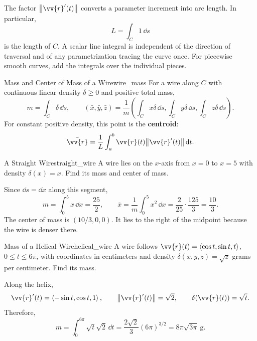 \newpage
The factor $\norm{\vv{r}'(t)}$ converts a parameter increment into arc length. In particular,
\[
    L = \int_C 1\,\dd{s}
\]
is the length of $C$. A scalar line integral is independent of the direction of traversal and of any parametrization tracing the curve once. For piecewise smooth curves, add the integrals over the individual pieces.

\begin{theorem}{Mass and Center of Mass of a Wire}{wire_mass}
For a wire along $C$ with continuous linear density $\delta \ge 0$ and positive total mass,
\[
    m = \int_C \delta\,\dd{s},\qquad
    (\bar{x},\bar{y},\bar{z})
    = \frac{1}{m}\left(\int_C x\delta\,\dd{s},
    \int_C y\delta\,\dd{s},\int_C z\delta\,\dd{s}\right).
\]
For constant positive density, this point is the \textbf{centroid}:
\[
    \bar{\vv{r}} = \frac{1}{L}\int_a^b \vv{r}(t)\norm{\vv{r}'(t)}\,\dd{t}.
\]
\end{theorem}

\begin{problem}{A Straight Wire}{straight_wire}
A wire lies on the $x$-axis from $x = 0$ to $x = 5$ with density $\delta(x) = x$. Find its mass and center of mass.
\end{problem}
\begin{sol}
Since $\dd{s} = \dd{x}$ along this segment,
\[
    m = \int_0^5 x\,\dd{x} = \frac{25}{2},\qquad
    \bar{x} = \frac{1}{m}\int_0^5 x^2\,\dd{x}
    = \frac{2}{25}\cdot\frac{125}{3} = \frac{10}{3}.
\]
The center of mass is $\boxed{(10/3,0,0)}$. It lies to the right of the midpoint because the wire is denser there.
\end{sol}




\newpage
\begin{problem}{Mass of a Helical Wire}{helical_wire}
A wire follows $\vv{r}(t) = \ang{\cos t,\sin t,t}$, $0 \le t \le 6\pi$, with coordinates in centimeters and density $\delta(x,y,z) = \sqrt{z}$ grams per centimeter. Find its mass.
\end{problem}
\begin{sol}
Along the helix,
\[
    \vv{r}'(t) = \ang{-\sin t,\cos t,1},\qquad
    \norm{\vv{r}'(t)} = \sqrt{2},\qquad \delta(\vv{r}(t)) = \sqrt{t}.
\]
Therefore,
\[
    m = \int_0^{6\pi}\sqrt{t}\sqrt{2}\,\dd{t}
    = \frac{2\sqrt{2}}{3}(6\pi)^{3/2}
    = \boxed{8\pi\sqrt{3\pi}\ \mathrm{g}}.
\]
\end{sol}


